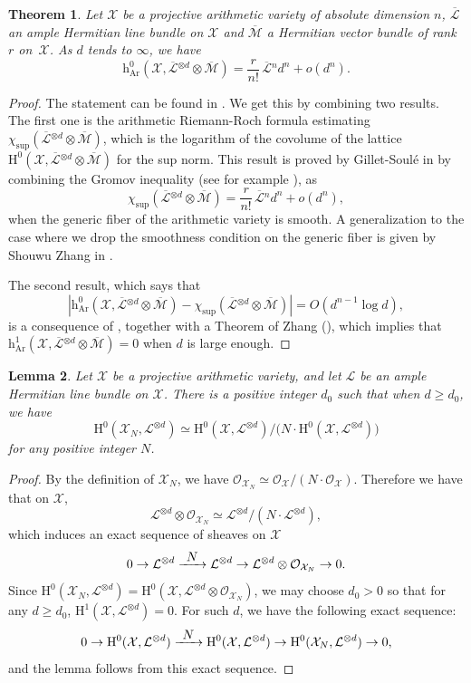 \documentclass[JEP,XML,SOM,Unicode,published]{cedram}
\newcommand{\To}[1]{\mathchoice{\xrightarrow{\textstyle\kern4pt#1\kern3pt}}{\stackrel{#1}{\longrightarrow}}{}{}}
\theoremstyle{plain}
\newtheorem{thm}{Theorem}[section]
\newtheorem{lem}[thm]{Lemma}
\theoremstyle{definition}
\newcommand{\ho}{\mathrm{H}}
\newcommand{\X}{\mathcal{X}}
\newcommand{\Li}{\overline{\mathcal{L}}{}}
\newcommand{\li}{\mathcal{L}}
\begin{document}
\begin{thm}\label{hilbsamu}
Let $\X$ be a projective arithmetic variety of absolute dimension $n$, $\Li$ an ample Hermitian line bundle on $\X$ and $\overline{\mathcal{M}}$ a Hermitian vector bundle of rank~$r$ on~$\X$. As $d$ tends to $\infty$, we have
\[
\mathrm{h}^0_{\mathrm{Ar}}(\X,\Li^{\otimes d}\otimes \overline{\mathcal{M}})= \frac{r}{n!}\,\Li^{n} d^n+o(d^n).
\]
\end{thm}
\begin{proof}[Proof]
The statement can be found in \cite[Cor.\,2.7 (1)]{Yu08}. We get this by combining two results. The first one is the arithmetic Riemann-Roch formula esti\-ma\-ting $\chi_{\mathrm{sup}}(\Li^{\otimes d}\otimes \overline{\mathcal{M}})$, which is the logarithm of the covolume of the lattice \hbox{$\ho^0(\X, \Li^{\otimes d}\otimes \overline{\mathcal{M}})$} for the sup norm. This result is proved by Gillet-Soulé in \cite{GS92} by combining the Gromov inequality (see for example \cite[Cor.\,2.7 (2)]{Yu08}), as
\[
\chi_{\mathrm{sup}}(\Li^{\otimes d}\otimes \overline{\mathcal{M}})=\frac{r}{n!}\,\Li^{n} d^n+o(d^n),
\]
when the generic fiber of the arithmetic variety is smooth. A generalization to the case where we drop the smoothness condition on the generic fiber is given by Shouwu Zhang in \cite[Th.\,(1.4)]{Zh95}.

The second result, which says that
\[
|\mathrm{h}^0_{\mathrm{Ar}}(\X,\Li^{\otimes d}\otimes \overline{\mathcal{M}})-\chi_{\mathrm{sup}}(\Li^{\otimes d}\otimes \overline{\mathcal{M}})|
=O(d^{n-1}\log d),
\]
is a consequence of \cite[Th.\,2]{GS91}, together with a Theorem of Zhang (\cite[Th.\,4.2]{Zh95}), which implies that $\mathrm{h}^1_{\mathrm{Ar}}(\X,\Li^{\otimes d}\otimes \overline{\mathcal{M}})=0$ when $d$ is large enough.
\end{proof}

\label{arithample2}

\begin{lem}\label{freemod}
Let $\X$ be a projective arithmetic variety, and let $\li$ be an ample Hermitian line bundle on $\X$. There is a positive integer $d_0$ such that when $d\geq d_0$, we have
\[
\ho^0(\X_N,\li^{\otimes d})\simeq\ho^0(\X,\li^{\otimes d})/\big(N\cdot \ho^0(\X,\li^{\otimes d})\big)
\]
for any positive integer $N$.
\end{lem}
\begin{proof}[Proof]
By the definition of $\X_N$, we have $\mathcal{O}_{\X_N}\simeq \mathcal{O}_{\X}/(N\cdot \mathcal{O}_{\X})$. Therefore we have that on $\X$,
\[
\li^{\otimes d}\otimes \mathcal{O}_{\X_N}\simeq \li^{\otimes d}/(N\cdot \li^{\otimes d}),
\]
which induces an exact sequence of sheaves on $\X$
\[
0\to \li^{\otimes d}\To{N} \li^{\otimes d}\to \li^{\otimes d}\otimes \mathcal{O}_{\X_N}\to 0.
\]
Since $\ho^0(\X_N,\li^{\otimes d})=\ho^0(\X,\li^{\otimes d}\otimes \mathcal{O}_{\X_N})$, we may choose $d_0>0$ so that for any $d\geq d_0$, $\ho^1(\X,\li^{\otimes d})=0$. For such $d$, we have the following exact sequence:
\[
0\to \ho^0(\X,\li^{\otimes d})\To{N}\ho^0(\X,\li^{\otimes d})\to \ho^0(\X_N,\li^{\otimes d})\to 0,
\]
and the lemma follows from this exact sequence.
\end{proof}
\end{document}
